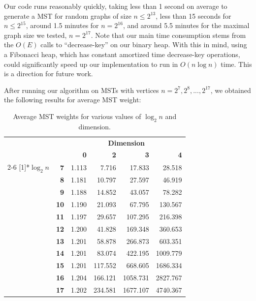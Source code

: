 \documentclass[a4paper]{article}
\begin{document}
Our code runs reasonably quickly, taking less than 1 second on average to generate a MST for random graphs of size $n\leq2^{13}$, less than 15 seconds for $n\leq 2^{15}$, around 1.5 minutes for $n=2^{16}$, and around 5.5 minutes for the maximal graph size we tested, $n=2^{17}$. Note that our main time consumption stems from the $O(E)$ calls to ``decrease-key'' on our binary heap. With this in mind, using a Fibonacci heap, which has constant amortized time decrease-key operations, could significantly speed up our implementation to run in $O(n\log n)$ time. This is a direction for future work.

\newpage
After running our algorithm on MSTs with vertices $n=2^7, 2^8, ..., 2^{17}$, we obtained the following results for average MST weight:

\begin{table}[htbp]
  \centering
    \begin{tabular}{cr|rrrr}
          & \multicolumn{1}{r}{} & \multicolumn{4}{c}{\textbf{Dimension}} \\
          &       & \textbf{0} & \textbf{2} & \textbf{3} & \textbf{4} \\
\cmidrule{2-6}    \multirow{11}[1]{*}{\textbf{$\log_2n$}} & \textbf{7} & 1.113 & 7.716 & 17.833 & 28.518 \\
          & \textbf{8} & 1.181 & 10.797 & 27.597 & 46.919 \\
          & \textbf{9} & 1.188 & 14.852 & 43.057 & 78.282 \\
          & \textbf{10} & 1.190 & 21.093 & 67.795 & 130.567 \\
          & \textbf{11} & 1.197 & 29.657 & 107.295 & 216.398 \\
          & \textbf{12} & 1.200 & 41.828 & 169.348 & 360.653 \\
          & \textbf{13} & 1.201 & 58.878 & 266.873 & 603.351 \\
          & \textbf{14} & 1.201 & 83.074 & 422.195 & 1009.779 \\
          & \textbf{15} & 1.201 & 117.552 & 668.605 & 1686.334 \\
          & \textbf{16} & 1.204 & 166.121 & 1058.731 & 2827.767 \\
          & \textbf{17} & 1.202 & 234.581 & 1677.107 & 4740.367 \\
    \end{tabular}%
  \caption{Average MST weights for various values of $\log_2n$ and dimension.}
  \label{tab:addlabel}%
\end{table}%
\end{document}
